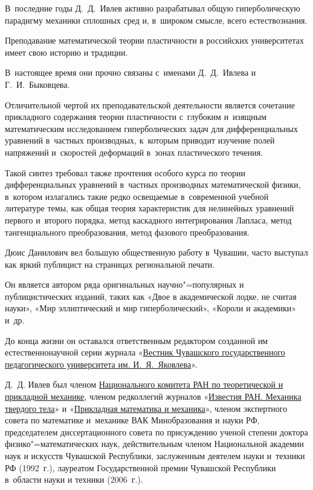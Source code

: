 \renewcommand{\baselinestretch}{0.92}



В~последние годы Д.~Д.~Ивлев активно разрабатывал общую гиперболическую парадигму механики сплошных сред и, в~широком смысле, всего естествознания.



Преподавание математической теории пластичности в российских университетах имеет свою историю и традиции. 

В~настоящее время они прочно связаны с~именами Д.~Д.~Ивлева и Г.~И.~Быковцева. 

Отличительной чертой их преподавательской деятельности является сочетание прикладного содержания теории пластичности с~глубоким и~изящным математическим исследованием гиперболических задач для дифференциальных уравнений в~частных производных, к~которым приводит изучение полей напряжений и~скоростей деформаций в~зонах пластического течения.

Такой синтез требовал также прочтения особого курса по теории дифференциальных уравнений в~частных производных математической физики, в~котором излагались такие редко освещаемые в~современной учебной литературе темы, как общая теория характеристик для нелинейных уравнений первого и~второго порядка, метод каскадного интегрирования Лапласа, метод тангенциального преобразования, метод фазового преобразования.



Дюис Данилович вел большую общественную работу в~Чувашии, часто выступал как яркий публицист на страницах региональной печати. 

Он является автором ряда оригинальных научно"=популярных и публицистических изданий, таких как «Двое в академической лодке, не считая науки», «Мир эллиптический и мир гиперболический», «Короли и академики» и~др. 

До конца жизни он оставался ответственным редактором созданной им естественнонаучной серии журнала «\href{http://vestnik.chgpu.edu.ru/}{Вестник Чувашского государственного педагогического университета им. И.~Я.~Яковлева}».



Д.~Д. Ивлев был членом \href{http://www.ipmnet.ru/RNCTAM/}{Национального комитета РАН по теоретической и прикладной механике}, членом редколлегий журналов «\href{http://mtt.ipmnet.ru/ru/}{Известия РАН. Механика твердого тела}» и «\href{http://pmm.ipmnet.ru/ru/}{Прикладная математика и механика}», членом экспертного совета по математике и~механике ВАК Минобразования и науки РФ, председателем диссертационного совета по присуждению ученой степени доктора физико"=математических наук, действительным членом Национальной академии наук и искусств Чувашской Республики, заслуженным деятелем науки и~техники РФ (1992~г.), лауреатом Государственной премии Чувашской Республики в~области науки и техники (2006~г.). 

